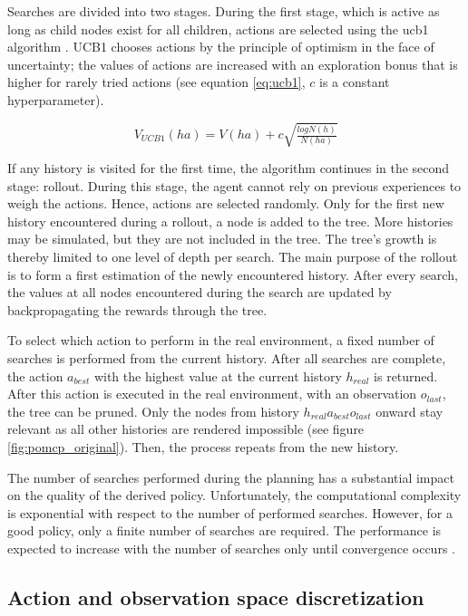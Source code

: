 Searches are divided into two stages. During the first stage, which is active as long as child nodes exist for all children, actions are selected using the \acrfull{ucb1} algorithm \parencite{ucb1}. UCB1 chooses actions by the principle of optimism in the face of uncertainty; the values of actions are increased with an exploration bonus that is higher for rarely tried actions (see equation \ref{eq:ucb1}, $c$ is a constant hyperparameter). 

\begin{equation}
    V_{UCB1}(ha) = V(ha) + c\sqrt{\tfrac{log N(h)}{N(ha)}}
    \label{eq:ucb1}
\end{equation}

If any history is visited for the first time, the algorithm continues in the second stage: rollout. During this stage, the agent cannot rely on previous experiences to weigh the actions. Hence, actions are selected randomly. Only for the first new history encountered during a rollout, a node is added to the tree. More histories may be simulated, but they are not included in the tree. The tree's growth is thereby limited to one level of depth per search. The main purpose of the rollout is to form a first estimation of the newly encountered history. After every search, the values at all nodes encountered during the search are updated by backpropagating the rewards through the tree.

To select which action to perform in the real environment, a fixed number of searches is performed from the current history. After all searches are complete, the action $a_{best}$ with the highest value at the current history $h_{real}$ is returned. After this action is executed in the real environment, with an observation $o_{last}$, the tree can be pruned. Only the nodes from history $h_{real}a_{best}o_{last}$ onward stay relevant as all other histories are rendered impossible (see figure \ref{fig:pomcp_original}). Then, the process repeats from the new history.

The number of searches performed during the planning has a substantial impact on the quality of the derived policy. Unfortunately, the computational complexity is exponential with respect to the number of performed searches. However, for a good policy, only a finite number of searches are required. The performance is expected to increase with the number of searches only until convergence occurs \parencite{pomcp}.

\subsection{Action and observation space discretization}
\label{sec:discretization}

